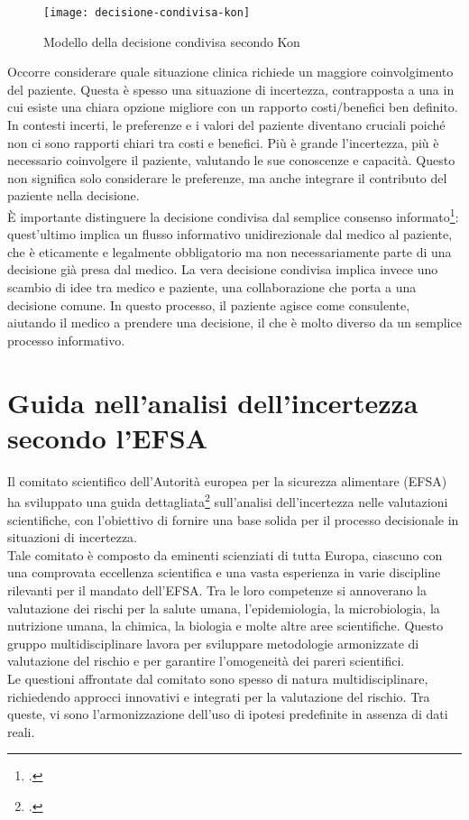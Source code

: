 \begin{figure}[!ht] 
    \centering 
    \texttt{[image: decisione-condivisa-kon]} 
    \caption{Modello della decisione condivisa secondo Kon}
\end{figure}

Occorre considerare quale situazione clinica richiede un maggiore coinvolgimento del paziente. Questa è spesso una situazione di incertezza, contrapposta a una in cui esiste una chiara opzione migliore con un rapporto costi/benefici ben definito. In contesti incerti, le preferenze e i valori del paziente diventano cruciali poiché non ci sono rapporti chiari tra costi e benefici. Più è grande l'incertezza, più è necessario coinvolgere il paziente, valutando le sue conoscenze e capacità. Questo non significa solo considerare le preferenze, ma anche integrare il contributo del paziente nella decisione.\\

È importante distinguere la decisione condivisa dal semplice consenso informato\footcite{womak:recenti-progressi-medicina}: quest'ultimo implica un flusso informativo unidirezionale dal medico al paziente, che è eticamente e legalmente obbligatorio ma non necessariamente parte di una decisione già presa dal medico. La vera decisione condivisa implica invece uno scambio di idee tra medico e paziente, una collaborazione che porta a una decisione comune. In questo processo, il paziente agisce come consulente, aiutando il medico a prendere una decisione, il che è molto diverso da un semplice processo informativo.


\section{Guida nell'analisi dell'incertezza secondo l'EFSA}
Il comitato scientifico dell'Autorità europea per la sicurezza alimentare (EFSA) ha sviluppato una guida dettagliata\footcite{womak:guida-analisi-incertezza} sull'analisi dell'incertezza nelle valutazioni scientifiche, con l'obiettivo di fornire una base solida per il processo decisionale in situazioni di incertezza.\\
Tale comitato è composto da eminenti scienziati di tutta Europa, ciascuno con una comprovata eccellenza scientifica e una vasta esperienza in varie discipline rilevanti per il mandato dell'EFSA. Tra le loro competenze si annoverano la valutazione dei rischi per la salute umana, l'epidemiologia, la microbiologia, la nutrizione umana, la chimica, la biologia e molte altre aree scientifiche. Questo gruppo multidisciplinare lavora per sviluppare metodologie armonizzate di valutazione del rischio e per garantire l'omogeneità dei pareri scientifici.\\
Le questioni affrontate dal comitato sono spesso di natura multidisciplinare, richiedendo approcci innovativi e integrati per la valutazione del rischio. Tra queste, vi sono l'armonizzazione dell'uso di ipotesi predefinite in assenza di dati reali.\\

